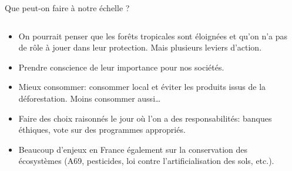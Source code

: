 \documentclass[10pt,table,dvipsnames,compress]{beamer}
\begin{document}
\begin{frame}[label={sec:org42073c0}]{Que peut-on faire à notre échelle ?}
\begin{columns}
\begin{column}{0.7\columnwidth}
\begin{itemize}
\item On pourrait penser que les forêts tropicales sont éloignées et qu'on n'a pas de rôle à jouer dans leur protection. Mais plusieurs leviers d'action.
\item Prendre conscience de leur importance pour nos sociétés.
\item Mieux consommer: consommer local et éviter les produits issus de la déforestation. Moins consommer aussi\ldots{}
\item Faire des choix raisonnés le jour où l'on a des responsabilités: banques éthiques, vote sur des programmes appropriés.
\item Beaucoup d'enjeux en France également sur la conservation des écosystèmes (A69, pesticides, loi contre l'artificialisation des sols, etc.).
\end{itemize}
\end{column}
\begin{column}{0.3\columnwidth}
\begin{center}

\end{center}
\end{column}
\end{columns}
\end{frame}
\end{document}
